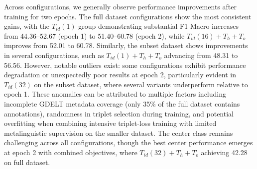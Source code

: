 Across configurations, we generally observe performance improvements after training for two epochs. The full dataset configurations show the most consistent gains, with the $T_{id}(1)$ group demonstrating substantial F1-Macro increases from 44.36--52.67 (epoch 1) to 51.40--60.78 (epoch 2), while $T_{id}(16) + T_h + T_o$ improves from 52.01 to 60.78. Similarly, the subset dataset shows improvements in several configurations, such as $T_{id}(1) + T_h + T_o$ advancing from 48.31 to 56.56. However, notable outliers exist: some configurations exhibit performance degradation or unexpectedly poor results at epoch 2, particularly evident in $T_{id}(32)$ on the subset dataset, where several variants underperform relative to epoch 1. These anomalies can be attributed to multiple factors including incomplete GDELT metadata coverage (only 35\% of the full dataset contains annotations), randomness in triplet selection during training, and potential overfitting when combining intensive triplet-loss training with limited metalinguistic supervision on the smaller dataset. The center class remains challenging across all configurations, though the best center performance emerges at epoch 2 with combined objectives, where $T_{id}(32) + T_h + T_o$ achieving 42.28 on full dataset.

